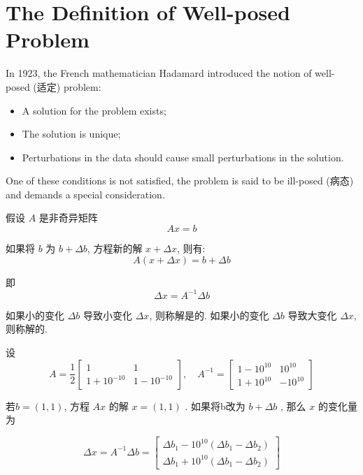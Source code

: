 \section{The Definition of Well-posed Problem}

In 1923, the French mathematician Hadamard introduced the notion of well-posed (适定)  problem:

\begin{itemize}
    \item A solution for the problem exists;
    \item The solution is unique;
    \item Perturbations in the data should cause small perturbations in the solution.
\end{itemize}

One of these conditions is not satisfied, the problem is said to be ill-posed (病态) and demands a special consideration.

\begin{definition}
    假设 $ A $ 是非奇异矩阵 $$ A x=b $$

    如果将 $ b $ 为 $ b+\Delta b $, 方程新的解 $ x+\Delta x $, 则有:
$$
A(x+\Delta x)=b+\Delta b
$$

即
$$
\Delta x=A^{-1} \Delta b
$$

如果小的变化 $ \Delta b $ 导致小变化 $ \Delta x $, 则称解是的. 如果小的变化 $ \Delta b $ 导致大变化 $ \Delta x $, 则称解的. 
\end{definition}

\begin{example}
    设$$ A=\frac{1}{2}\left[\begin{array}{cc}1 & 1 \\ 1+10^{-10} & 1-10^{-10}\end{array}\right], \quad A^{-1}=\left[\begin{array}{cc}1-10^{10} & 10^{10} \\ 1+10^{10} & -10^{10}\end{array}\right] $$

若$ b=(1,1) $, 方程 $ A x $ 的解 $ x=(1,1) $ . 
如果将b改为 $ b+\Delta b $ , 那么 $ x $ 的变化量为

$$ \Delta x=A^{-1} \Delta b=\left[\begin{array}{l}\Delta b_{1}-10^{10}\left(\Delta b_{1}-\Delta b_{2}\right) \\ \Delta b_{1}+10^{10}\left(\Delta b_{1}-\Delta b_{2}\right)\end{array}\right] $$
\end{example}


